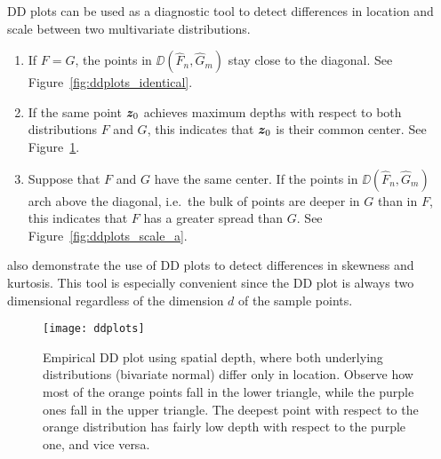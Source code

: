 DD plots can be used as a diagnostic tool to detect differences in location
and scale between two multivariate distributions.
\begin{enumerate}[itemsep=0em]
    \item If $F = G$, the points in $\DD(\hat{F}_n, \hat{G}_m)$ stay close to
    the diagonal.
    See Figure~\ref{fig:ddplots_identical}.

    \item If the same point $\bm{z}_0$ achieves maximum depths with respect to
    both distributions $F$ and $G$, this indicates that $\bm{z}_0$ is their
    common center.
    See Figure~\ref{fig:ddplots_location}.

    \item Suppose that $F$ and $G$ have the same center. If the points in
    $\DD(\hat{F}_n, \hat{G}_m)$ arch above the diagonal, i.e.\ the bulk of
    points are deeper in $G$ than in $F$, this indicates that $F$ has a
    greater spread than $G$.
    See Figure~\ref{fig:ddplots_scale_a}.
\end{enumerate}

\textcite{liu-parelius-singh-1999} also demonstrate the use of DD plots to
detect differences in skewness and kurtosis.
This tool is especially convenient since the DD plot is always two dimensional
regardless of the dimension $d$ of the sample points.


\begin{figure}
    \centering
    \texttt{[image: ddplots]}
    \caption{
        Empirical DD plot using spatial depth, where both underlying
        distributions (bivariate normal) differ only in location.
        Observe how most of the orange points fall in the lower triangle,
        while the purple ones fall in the upper triangle.
        The deepest point with respect to the orange distribution has fairly
        low depth with respect to the purple one, and vice versa.
    }
    \label{fig:ddplots_location}
\end{figure}



